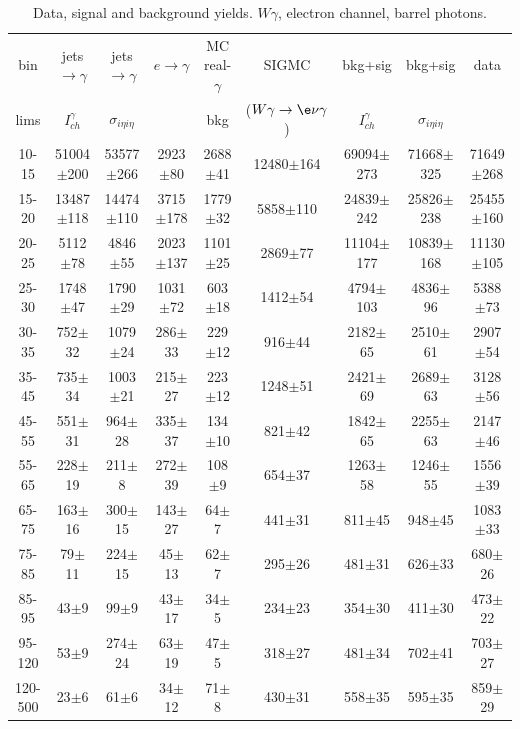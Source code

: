 \begin{table}[h]
  \tiny
  \begin{center}
  \caption{Data, signal and background yields. $W\gamma$, electron channel, barrel photons.}
  \begin{tabular}{|c|c|c|c|c|c|c|c|c|}
    bin & jets$\rightarrow\gamma$ & jets$\rightarrow\gamma$ & $e\rightarrow\gamma$ & MC real-$\gamma$ &  SIGMC & bkg+sig &  bkg+sig & data \\ 
    lims & $I_{ch}^{\gamma}$ & $\sigma_{i\eta i\eta}$ & & bkg & ($W\gamma\rightarrow\e\nu\gamma$) & $I_{ch}^{\gamma}$ &  $\sigma_{i\eta i\eta}$ &\\ \hline
10-15 & 51004$\pm$200 & 53577$\pm$266 & 2923$\pm$80 & 2688$\pm$41 & 12480$\pm$164 & 69094$\pm$273 & 71668$\pm$325 & 71649$\pm$268 \\ \hline 
15-20 & 13487$\pm$118 & 14474$\pm$110 & 3715$\pm$178 & 1779$\pm$32 & 5858$\pm$110 & 24839$\pm$242 & 25826$\pm$238 & 25455$\pm$160 \\ \hline 
20-25 & 5112$\pm$78 & 4846$\pm$55 & 2023$\pm$137 & 1101$\pm$25 & 2869$\pm$77 & 11104$\pm$177 & 10839$\pm$168 & 11130$\pm$105 \\ \hline 
25-30 & 1748$\pm$47 & 1790$\pm$29 & 1031$\pm$72 & 603$\pm$18 & 1412$\pm$54 & 4794$\pm$103 & 4836$\pm$96 & 5388$\pm$73 \\ \hline 
30-35 & 752$\pm$32 & 1079$\pm$24 & 286$\pm$33 & 229$\pm$12 & 916$\pm$44 & 2182$\pm$65 & 2510$\pm$61 & 2907$\pm$54 \\ \hline 
35-45 & 735$\pm$34 & 1003$\pm$21 & 215$\pm$27 & 223$\pm$12 & 1248$\pm$51 & 2421$\pm$69 & 2689$\pm$63 & 3128$\pm$56 \\ \hline 
45-55 & 551$\pm$31 & 964$\pm$28 & 335$\pm$37 & 134$\pm$10 & 821$\pm$42 & 1842$\pm$65 & 2255$\pm$63 & 2147$\pm$46 \\ \hline 
55-65 & 228$\pm$19 & 211$\pm$8 & 272$\pm$39 & 108$\pm$9 & 654$\pm$37 & 1263$\pm$58 & 1246$\pm$55 & 1556$\pm$39 \\ \hline 
65-75 & 163$\pm$16 & 300$\pm$15 & 143$\pm$27 & 64$\pm$7 & 441$\pm$31 & 811$\pm$45 & 948$\pm$45 & 1083$\pm$33 \\ \hline 
75-85 & 79$\pm$11 & 224$\pm$15 & 45$\pm$13 & 62$\pm$7 & 295$\pm$26 & 481$\pm$31 & 626$\pm$33 & 680$\pm$26 \\ \hline 
85-95 & 43$\pm$9 & 99$\pm$9 & 43$\pm$17 & 34$\pm$5 & 234$\pm$23 & 354$\pm$30 & 411$\pm$30 & 473$\pm$22 \\ \hline 
95-120 & 53$\pm$9 & 274$\pm$24 & 63$\pm$19 & 47$\pm$5 & 318$\pm$27 & 481$\pm$34 & 702$\pm$41 & 703$\pm$27 \\ \hline 
120-500 & 23$\pm$6 & 61$\pm$6 & 34$\pm$12 & 71$\pm$8 & 430$\pm$31 & 558$\pm$35 & 595$\pm$35 & 859$\pm$29 \\ \hline 
  \end{tabular}
  \label{tab:yields_Wg_to_enu__Barrel_}
  \end{center}
\end{table}

